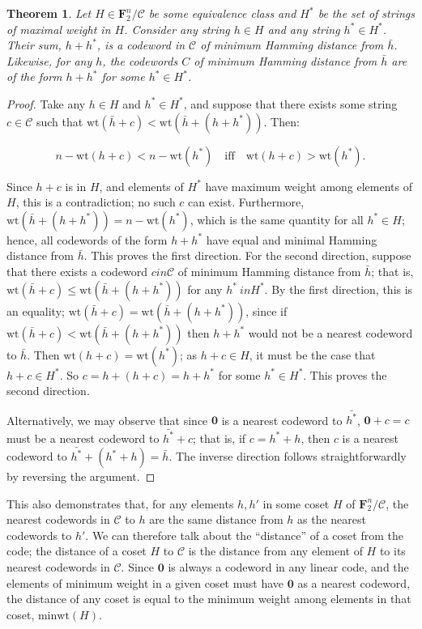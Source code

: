 \documentclass{article}
\newtheorem{theorem}{Theorem}
\newcommand{\FF}{\mathbf{F}}
\newcommand{\calC}{\mathcal{C}}
\newcommand{\wt}{\text{wt}}
\newcommand{\minwt}{\text{minwt}}
\begin{document}
\begin{theorem}\label{thm:ncpeq}
    Let $H \in \FF_2^n/\calC$ be some equivalence class and $H^*$ be the set of strings of maximal weight in $H$. Consider any string $h \in H$ and any string $h^* \in H^*$. Their sum, $h + h^*$, is a codeword in $\calC$ of minimum Hamming distance from $\bar{h}$. Likewise, for any $h$, the codewords $C$ of minimum Hamming distance from $\bar{h}$ are of the form $h+h^*$ for some $h^* \in H^*$.
\end{theorem}
\begin{proof}
    Take any $h \in H$ and $h^* \in H^*$, and suppose that there exists some string $c \in \calC$ such that $\wt(\bar{h}+c) < \wt(\bar{h}+(h+h^*))$. Then:
    
    \[
        n - \wt(h + c) < n - \wt(h^*)
        \quad\text{iff}\quad
        \wt(h + c)>\wt(h^*).
    \]
    
    Since $h + c$ is in $H$, and elements of $H^*$ have maximum weight among elements of $H$, this is a contradiction; no such $c$ can exist. Furthermore, $\wt(\bar{h} + (h + h^*)) = n - \wt(h^*)$, which is the same quantity for all $h^* \in H$; hence, all codewords of the form $h+h^*$ have equal and minimal Hamming distance from $\bar{h}$. This proves the first direction. For the second direction, suppose that there exists a codeword $c in \calC$ of minimum Hamming distance from $\bar{h}$; that is, $\wt(\bar{h} + c) \leq \wt(\bar{h} + (h+h^*))$ for any $h^* \ in H^*$. By the first direction, this is an equality; $\wt(\bar{h} + c) = \wt(\bar{h} + (h + h^*))$, since if $\wt(\bar{h} + c) < \wt(\bar{h} + (h + h^*))$ then $h + h^*$ would not be a nearest codeword to $\bar{h}$. Then $\wt(h + c) = \wt(h^*)$; as $h + c \in H$, it must be the case that $h + c \in H^*$. So $c = h + (h + c) = h + h^*$ for some $h^* \in H^*$. This proves the second direction.

    Alternatively, we may observe that since $\mathbf{0}$ is a nearest codeword to $\bar{h^*}$, $\mathbf{0}+c = c$ must be a nearest codeword to $\bar{h^*} + c$; that is, if $c = h^* + h$, then $c$ is a nearest codeword to $\bar{h^*} + (h^* + h) = \bar{h}$. The inverse direction follows straightforwardly by reversing the argument.
\end{proof}

This also demonstrates that, for any elements $h, h'$ in some coset $H$ of $\FF_2^n/\calC$, the nearest codewords in $\calC$ to $h$ are the same distance from $h$ as the nearest codewords to $h'$. We can therefore talk about the ``distance'' of a coset from the code; the distance of a coset $H$ to $\calC$ is the distance from any element of $H$ to its nearest codewords in $\calC$. Since $\mathbf{0}$ is always a codeword in any linear code, and the elements of minimum weight in a given coset must have $\mathbf{0}$ as a nearest codeword, the distance of any coset is equal to the minimum weight among elements in that coset, $\minwt(H)$.
\end{document}
